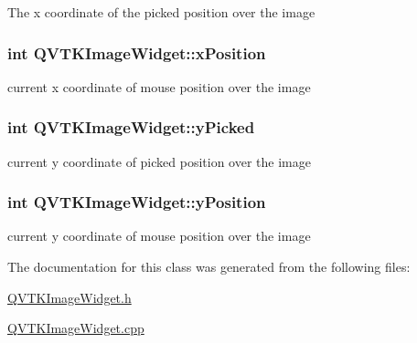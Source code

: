 The x coordinate of the picked position over the image \hypertarget{class_q_v_t_k_image_widget_afd88ea5dbed175232b0c15cbe4cdca89}{
\subsubsection[{x\-Position}]{\setlength{\rightskip}{0pt plus 5cm}int {\bf Q\-V\-T\-K\-Image\-Widget\-::x\-Position}}}\label{d8/dd7/class_q_v_t_k_image_widget_afd88ea5dbed175232b0c15cbe4cdca89}
current x coordinate of mouse position over the image \hypertarget{class_q_v_t_k_image_widget_a484346a1e5c956917e7e35a22aee125a}{
\subsubsection[{y\-Picked}]{\setlength{\rightskip}{0pt plus 5cm}int {\bf Q\-V\-T\-K\-Image\-Widget\-::y\-Picked}}}\label{d8/dd7/class_q_v_t_k_image_widget_a484346a1e5c956917e7e35a22aee125a}
current y coordinate of picked position over the image \hypertarget{class_q_v_t_k_image_widget_a6724caff3a614db8321deaa70532255c}{
\subsubsection[{y\-Position}]{\setlength{\rightskip}{0pt plus 5cm}int {\bf Q\-V\-T\-K\-Image\-Widget\-::y\-Position}}}\label{d8/dd7/class_q_v_t_k_image_widget_a6724caff3a614db8321deaa70532255c}
current y coordinate of mouse position over the image 

The documentation for this class was generated from the following files\-:\begin{DoxyCompactItemize}
\item 
\hyperlink{_q_v_t_k_image_widget_8h}{Q\-V\-T\-K\-Image\-Widget.\-h}\item 
\hyperlink{_q_v_t_k_image_widget_8cpp}{Q\-V\-T\-K\-Image\-Widget.\-cpp}\end{DoxyCompactItemize}
